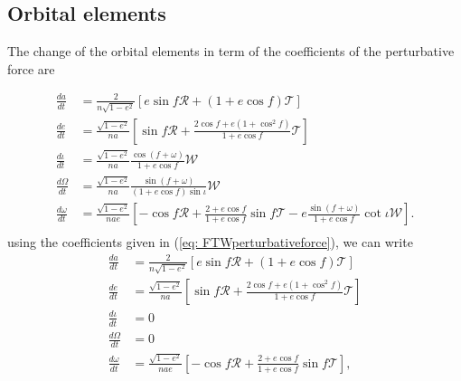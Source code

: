 \subsection{Orbital elements}

The change of the orbital elements in term of the coefficients of the perturbative force are \cite{Brumberg, Larranaga}

\begin{subequations}\label{eq:OsculatingOrbitalElements}
\begin{align}
\frac{da}{dt} &= \frac{2}{n \sqrt{1-e^2}} \left[ e \sin f \mathcal{R} + (1+e\cos f) \mathcal{T} \right] \\
\frac{de}{dt} &= \frac{\sqrt{1-e^2}}{na} \left[ \sin f \mathcal{R} + \frac{2\cos f + e \left( 1 + \cos^2 f \right) }{1 + e\cos f} \mathcal{T} \right] \\
\frac{d \iota}{dt} &= \frac{\sqrt{1-e^2}}{na} \frac{\cos (f+\omega)}{1+e\cos f} \mathcal{W} \\
\frac{d \Omega}{dt} &= \frac{\sqrt{1-e^2}}{na} \frac{\sin (f+\omega)}{(1+e\cos f)\sin \iota } \mathcal{W} \\
\frac{d\omega}{dt} &=\frac{\sqrt{1-e^2}}{nae} \left[ -\cos f \mathcal{R} + \frac{2+e\cos f}{1 + e \cos f} \sin f \mathcal{T} - e  \frac{\sin (f + \omega)}{1 + e \cos f} \cot \iota \mathcal{W} \right].\\
\end{align}
\end{subequations}
using the coefficients given in (\ref{eq: FTWperturbativeforce}), we can write
\begin{subequations}
\begin{align}
\frac{da}{dt} &= \frac{2}{n \sqrt{1-e^2}} \left[ e \sin f \mathcal{R} + (1+e\cos f) \mathcal{T} \right] \\
\frac{de}{dt} &= \frac{\sqrt{1-e^2}}{na} \left[ \sin f \mathcal{R} + \frac{2\cos f + e \left( 1 + \cos^2 f \right) }{1 + e\cos f} \mathcal{T} \right] \\
\frac{d \iota}{dt} &= 0 \\
\frac{d \Omega}{dt} &= 0 \\
\frac{d\omega}{dt} &=\frac{\sqrt{1-e^2}}{nae} \left[ -\cos f \mathcal{R} + \frac{2+e\cos f}{1 + e \cos f} \sin f \mathcal{T}  \right], \\
\end{align}
\end{subequations}

